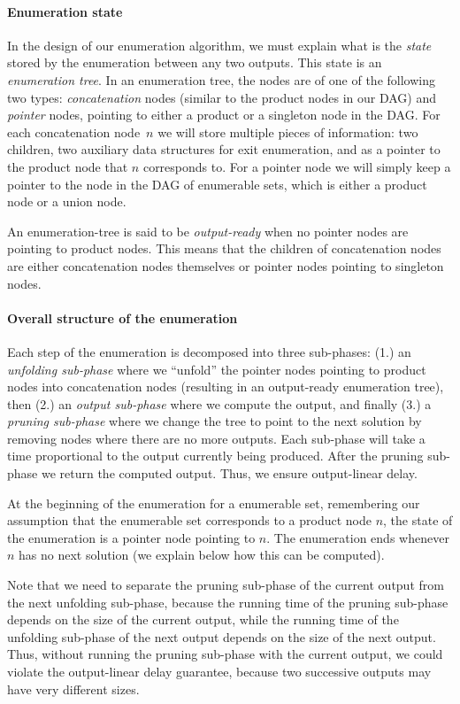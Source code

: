  \paragraph{Enumeration state}
 In the design of our enumeration algorithm, we must explain what is the
 \emph{state} stored by the enumeration between any two outputs. This state
 is an \emph{enumeration tree}. In
 an enumeration tree, the nodes are of one of the following two
 types: \emph{concatenation} nodes (similar to the product nodes in our DAG)
 and \emph{pointer} nodes, pointing to either a product or a singleton
 node in the DAG. For each concatenation node~$n$ we will store multiple
 pieces of information: two children, two auxiliary data structures for
 exit enumeration, and 
 as a pointer to the product node that $n$ corresponds to. For
 a pointer node we will simply keep a pointer to the node in the DAG of
 enumerable sets, which is either a product node or a union node.
 
 An enumeration-tree is said to be \emph{output-ready} when no pointer nodes are
 pointing to product nodes. This means that the children
 of concatenation nodes are either concatenation nodes themselves or
 pointer nodes pointing to singleton nodes.
 
 \paragraph{Overall structure of the enumeration}
 Each step of the enumeration is decomposed into three sub-phases:
 (1.) an \emph{unfolding sub-phase} where we ``unfold'' the pointer nodes
 pointing to product nodes into concatenation nodes (resulting in an
 output-ready enumeration tree), then (2.) an \emph{output sub-phase} where we
 compute the output, and finally (3.) a \emph{pruning sub-phase} where we change
 the tree to point to the next solution by removing nodes where there
 are no more outputs. Each sub-phase will take a time proportional to the
 output currently being produced. After the pruning sub-phase we return the computed
 output. Thus, we ensure output-linear delay.
 
 At the beginning of the enumeration for a enumerable set, remembering our
 assumption that the enumerable set corresponds 
 to a product node $n$, the state of the enumeration is a pointer node
 pointing to $n$. The enumeration ends whenever $n$ has no next
 solution (we explain below how this can be computed).
 
 Note that we need to separate the pruning sub-phase of the current output
 from the next unfolding sub-phase, because the running time of the pruning sub-phase 
 depends on the size of the current output, while the running time of the
 unfolding sub-phase of
 the next output depends on the size of the next output. Thus, without running
 the pruning sub-phase with the current output, we could violate the output-linear
 delay guarantee, because two successive outputs may have very different sizes.
 
